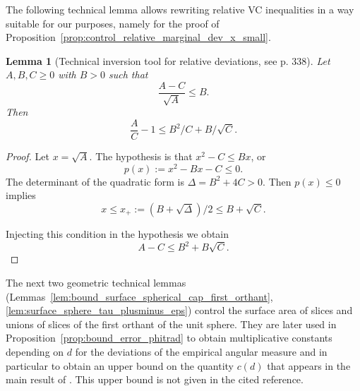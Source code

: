 \documentclass{article}
\numberwithin{equation}{section}
\newtheorem{lemma}{Lemma}[section]
\begin{document}
The following technical lemma allows rewriting relative VC inequalities in a way suitable for our purposes, namely for the proof of Proposition~\ref{prop:control_relative_marginal_dev_x_small}.  
\begin{lemma}[Technical inversion tool for relative deviations, see \cite{lugosi2002pattern} p. 338]\label{lem:rel_dev_abc}
  Let $A,B,C\ge 0$ with $B>0$ such that
  $$
\frac{A - C}{ \sqrt{A}} \le B. 
$$
Then
\begin{equation*}
\frac{A}{C} -1 \le B^2/C + B/\sqrt{C}. 
\end{equation*}
\end{lemma}
\begin{proof} 

  Let $x= \sqrt A$. The hypothesis is that $x^2 - C \le B x$, or 
  $$
p(x) := x^2 - Bx - C \le 0.  
$$
The determinant of the quadratic form is $\Delta = B^2 +4 C > 0$. Then $p(x)\le 0$ implies
$$
x \le x_+ := (B + \sqrt{\Delta})/2 \le B+ \sqrt{C}. 
$$


Injecting  this condition in the hypothesis we obtain
$$
A -C \le B^2 + B\sqrt{C}.
$$

\end{proof}

The next two geometric technical lemmas  (Lemmas~\ref{lem:bound_surface_spherical_cap_first_orthant}, \ref{lem:surface_sphere_tau_plusminus_eps}) control the surface area of slices and unions of slices of the first orthant of the unit sphere.  They are later used in Proposition~\ref{prop:bound_error_phitrad} to obtain multiplicative constants depending on $d$ for the deviations of the empirical angular measure and  in particular to obtain an upper bound on the quantity  $c(d)$ that appears in the main result of \cite{ClemenconJalalzaiSabourinSegers2023}. This upper bound   is not given in the cited reference.
\end{document}
